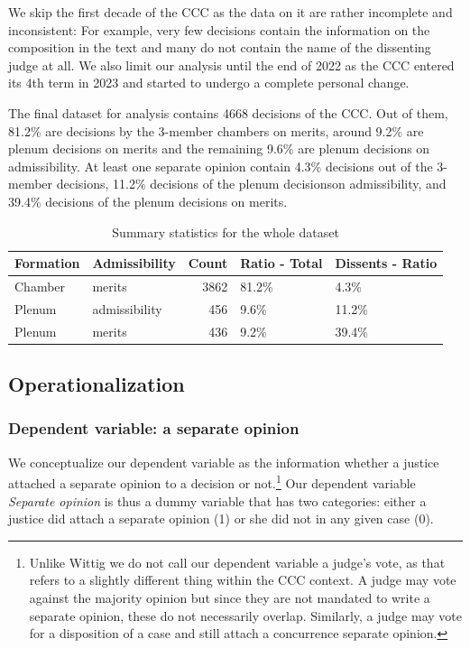 \documentclass[
  11pt,
]{article}
\begin{document}
We skip the first decade of the CCC as the data on it are rather
incomplete and inconsistent: For example, very few decisions contain the
information on the composition in the text and many do not contain the
name of the dissenting judge at all. We also limit our analysis until
the end of 2022 as the CCC entered its 4th term in 2023 and started to
undergo a complete personal change.

The final dataset for analysis contains 4668 decisions of the CCC. Out
of them, 81.2\% are decisions by the 3-member chambers on merits, around
9.2\% are plenum decisions on merits and the remaining 9.6\% are plenum
decisions on admissibility. At least one separate opinion contain 4.3\%
decisions out of the 3-member decisions, 11.2\% decisions of the plenum
decisionson admissibility, and 39.4\% decisions of the plenum decisions
on merits.

\begin{table}

\caption{\label{tab:unnamed-chunk-2}Summary statistics for the whole dataset}
\centering
\begin{tabular}[t]{l|l|r|l|l}
\hline
\textbf{Formation} & \textbf{Admissibility} & \textbf{Count} & \textbf{Ratio - Total} & \textbf{Dissents - Ratio}\\
\hline
Chamber & merits & 3862 & 81.2\% & 4.3\%\\
\hline
Plenum & admissibility & 456 & 9.6\% & 11.2\%\\
\hline
Plenum & merits & 436 & 9.2\% & 39.4\%\\
\hline
\end{tabular}
\end{table}

\hypertarget{operationalization}{%
\subsection{Operationalization}\label{operationalization}}

\hypertarget{dependent-variable-a-separate-opinion}{%
\subsubsection{Dependent variable: a separate
opinion}\label{dependent-variable-a-separate-opinion}}

We conceptualize our dependent variable as the information whether a
justice attached a separate opinion to a decision or not.\footnote{Unlike
  Wittig we do not call our dependent variable a judge's vote, as that
  refers to a slightly different thing within the CCC context. A judge
  may vote against the majority opinion but since they are not mandated
  to write a separate opinion, these do not necessarily overlap.
  Similarly, a judge may vote for a disposition of a case and still
  attach a concurrence separate opinion.} Our dependent variable
\emph{Separate opinion} is thus a dummy variable that has two
categories: either a justice did attach a separate opinion (1) or she
did not in any given case (0).
\end{document}
